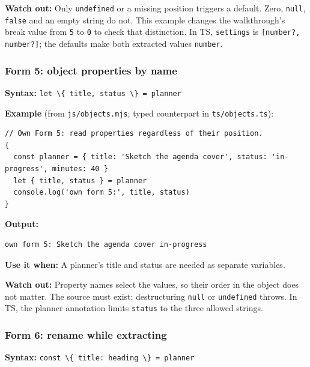 \documentclass[
  11pt,
]{article}
\newcommand{\passthrough}[1]{#1}
\begin{document}
\textbf{Watch out:} Only \passthrough{\lstinline!undefined!} or a
missing position triggers a default. Zero,
\passthrough{\lstinline!null!}, \passthrough{\lstinline!false!} and an
empty string do not. This example changes the walkthrough's break value
from \passthrough{\lstinline!5!} to \passthrough{\lstinline!0!} to check
that distinction. In TS, \passthrough{\lstinline!settings!} is
\passthrough{\lstinline![number?, number?]!}; the defaults make both
extracted values \passthrough{\lstinline!number!}.

\subsubsection{Form 5: object properties by
name}\label{form-5-object-properties-by-name}

\textbf{Syntax:}
\passthrough{\lstinline!let \{ title, status \} = planner!}

\textbf{Example} (from \passthrough{\lstinline!js/objects.mjs!}; typed
counterpart in \passthrough{\lstinline!ts/objects.ts!}):

\begin{lstlisting}
// Own Form 5: read properties regardless of their position.
{
  const planner = { title: 'Sketch the agenda cover', status: 'in-progress', minutes: 40 }
  let { title, status } = planner
  console.log('own form 5:', title, status)
}
\end{lstlisting}

\textbf{Output:}

\begin{lstlisting}
own form 5: Sketch the agenda cover in-progress
\end{lstlisting}

\textbf{Use it when:} A planner's title and status are needed as
separate variables.

\textbf{Watch out:} Property names select the values, so their order in
the object does not matter. The source must exist; destructuring
\passthrough{\lstinline!null!} or \passthrough{\lstinline!undefined!}
throws. In TS, the planner annotation limits
\passthrough{\lstinline!status!} to the three allowed strings.

\subsubsection{Form 6: rename while
extracting}\label{form-6-rename-while-extracting}

\textbf{Syntax:}
\passthrough{\lstinline!const \{ title: heading \} = planner!}
\end{document}
